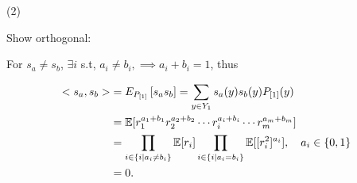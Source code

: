\documentclass[UTF8,a4paper,10pt]{article}
\begin{document}
(2)


Show orthogonal:

For \(s_a\neq s_b\),
 \(\exists i\) s.t, \(a_i \neq b_i, \implies a_i+b_i =1\), thus

\begin{equation*}
  \begin{aligned}
    <s_a,s_b> &=  E_{P_{[1]}}\left[s_a s_b\right]=\sum_{y \in Y_1} s_a(y) s_b(y) P_{[1]}(y)\\
    &=\operatorname{\mathbb{E}}[r_1^{a_1+b_1} r_2^{a_2+b_2} \cdots r_i^{a_i+b_i}\cdots r_m^{a_m+b_m}]\\
    &= \prod_{i\in \{i|a_i\neq b_i\} }\operatorname{\mathbb{E}}[ r_i]\prod_{i\in \{i|a_i= b_i\} }\operatorname{\mathbb{E}}[ [r_i^2]^{a_i}], \quad a_i\in \{0,1\}\\
    &= 0.
  \end{aligned}
\end{equation*}




\begin{equation*}
  \begin{aligned}
  \end{aligned}
\end{equation*}

\pagebreak



  
\end{document}
